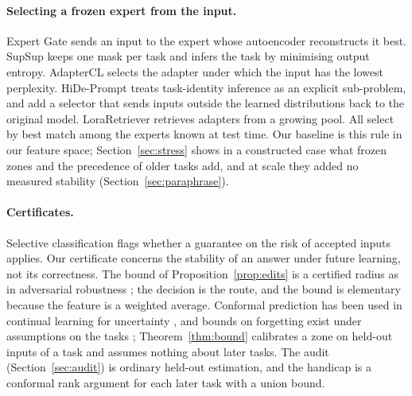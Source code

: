 \paragraph{Selecting a frozen expert from the input.} Expert Gate \citep{aljundi2017expertgate} sends
an input to the expert whose autoencoder reconstructs it best. SupSup \citep{wortsman2020supsup} keeps
one mask per task and infers the task by minimising output entropy. AdapterCL
\citep{madotto2021adaptercl} selects the adapter under which the input has the lowest perplexity.
HiDe-Prompt \citep{wang2023hide} treats task-identity inference as an explicit sub-problem, and
\citet{yu2024moeadapters} add a selector that sends inputs outside the learned distributions back to
the original model. LoraRetriever \citep{zhao2024loraretriever} retrieves adapters from a growing pool.
All select by best match among the experts known at test time. Our \nearest{} baseline is this rule in
our feature space; Section~\ref{sec:stress} shows in a constructed case what frozen zones and the
precedence of older tasks add, and at scale they added no measured stability
(Section~\ref{sec:paraphrase}).

\paragraph{Certificates.} Selective classification \citep{geifman2017selective} flags whether a
guarantee on the risk of accepted inputs applies. Our certificate concerns the stability of an answer
under future learning, not its correctness. The bound of Proposition~\ref{prop:edits} is a certified
radius as in adversarial robustness \citep{cohen2019smoothing}; the decision is the route, and the
bound is elementary because the feature is a weighted average. Conformal prediction has been used in
continual learning for uncertainty \citep{gao2025conformalcl}, and bounds on forgetting exist under
assumptions on the tasks \citep{friedman2024forgettingbounds}; Theorem~\ref{thm:bound} calibrates a
zone on held-out inputs of a task and assumes nothing about later tasks. The audit
(Section~\ref{sec:audit}) is ordinary held-out estimation, and the handicap is a conformal rank
argument for each later task with a union bound.

